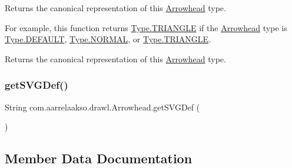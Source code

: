Returns the canonical representation of this \hyperlink{classcom_1_1aarrelaakso_1_1drawl_1_1_arrowhead}{Arrowhead} type. 

For example, this function returns \hyperlink{enumcom_1_1aarrelaakso_1_1drawl_1_1_arrowhead_1_1_type_a84bfc9a808825452b04017d73f63f99e}{Type.\+T\+R\+I\+A\+N\+G\+LE} if the \hyperlink{classcom_1_1aarrelaakso_1_1drawl_1_1_arrowhead}{Arrowhead} type is \hyperlink{enumcom_1_1aarrelaakso_1_1drawl_1_1_arrowhead_1_1_type_ae4c70d3cd0853637fba791f2bb29cd8e}{Type.\+D\+E\+F\+A\+U\+LT}, \hyperlink{enumcom_1_1aarrelaakso_1_1drawl_1_1_arrowhead_1_1_type_abd0879a22002109b53e3d6af939c0734}{Type.\+N\+O\+R\+M\+AL}, or \hyperlink{enumcom_1_1aarrelaakso_1_1drawl_1_1_arrowhead_1_1_type_a84bfc9a808825452b04017d73f63f99e}{Type.\+T\+R\+I\+A\+N\+G\+LE}.

\begin{DoxyReturn}{Returns}
the canonical representation of this \hyperlink{classcom_1_1aarrelaakso_1_1drawl_1_1_arrowhead}{Arrowhead} type. 
\end{DoxyReturn}
\mbox{\label{classcom_1_1aarrelaakso_1_1drawl_1_1_arrowhead_a0094c4f48945d782b7e474b15ef06561}} 
\subsubsection{\texorpdfstring{get\+S\+V\+G\+Def()}{getSVGDef()}}
{\footnotesize\ttfamily String com.\+aarrelaakso.\+drawl.\+Arrowhead.\+get\+S\+V\+G\+Def (\begin{DoxyParamCaption}{ }\end{DoxyParamCaption})\hspace{0.3cm}{\ttfamily [protected]}}



\subsection{Member Data Documentation}
\mbox{\label{classcom_1_1aarrelaakso_1_1drawl_1_1_arrowhead_a72183bdf6672377d73b2d9810b6d0ed7}} 
